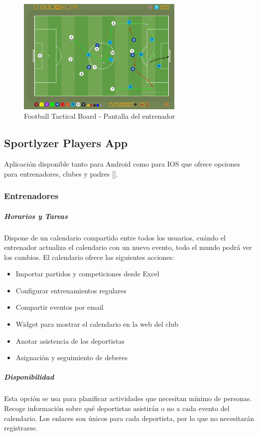 \begin{figure}[H]
    \centering
    \includegraphics[width=8cm]{archivos/tfg_jorge/tbo_pizarra}
    \caption{Football Tactical Board - Pantalla del entrenador}\label{sistemass2}
\end{figure}


\subsection{Sportlyzer Players App}
Aplicación disponible tanto para Android como para IOS que ofrece opciones para entrenadores, clubes y padres [\cite{SportlyzerApp}].

\subsubsection{Entrenadores}

\subparagraph{Horarios y Tareas}
Dispone de un calendario compartido entre todos los usuarios, cuándo el entrenador actualiza el calendario con un nuevo evento, todo el mundo podrá ver los cambios. El calendario ofrece las siguientes acciones:

\begin{itemize}
    \item Importar partidos y competiciones desde Excel
    \item Configurar entrenamientos regulares
    \item Compartir eventos por email
    \item Widget para mostrar el calendario en la web del club
    \item Anotar asistencia de los deportistas
    \item Asignación y seguimiento de deberes
\end{itemize}

\subparagraph{Disponibilidad}
Esta opción se usa para planificar actividades que necesitan mínimo de personas. Recoge información sobre qué deportistas asistirán o no a cada evento del calendario. Los enlaces son únicos para cada deportista, por lo que no necesitarán registrarse.

